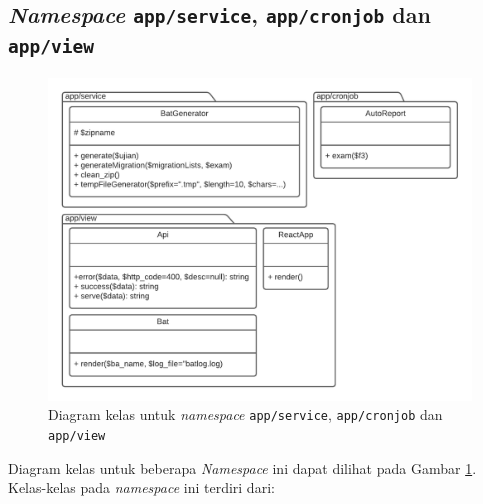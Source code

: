 \subsection{\textit{Namespace} \texttt{app/service}, \texttt{app/cronjob} dan \texttt{app/view}}
    \begin{figure}
        \centering
        \includegraphics[width=0.75\paperwidth]{Gambar/classmap-be/Classmap - app-service,cronjob,view.pdf}
        \caption{Diagram kelas untuk \textit{namespace} \texttt{app/service}, \texttt{app/cronjob} 
            dan \texttt{app/view}}
        \label{fig:classmap_app-service,cronjob,view}
    \end{figure}
    Diagram kelas untuk beberapa \textit{Namespace} ini dapat dilihat pada Gambar 
    \ref{fig:classmap_app-service,cronjob,view}. Kelas-kelas pada \textit{namespace} ini terdiri
    dari:
